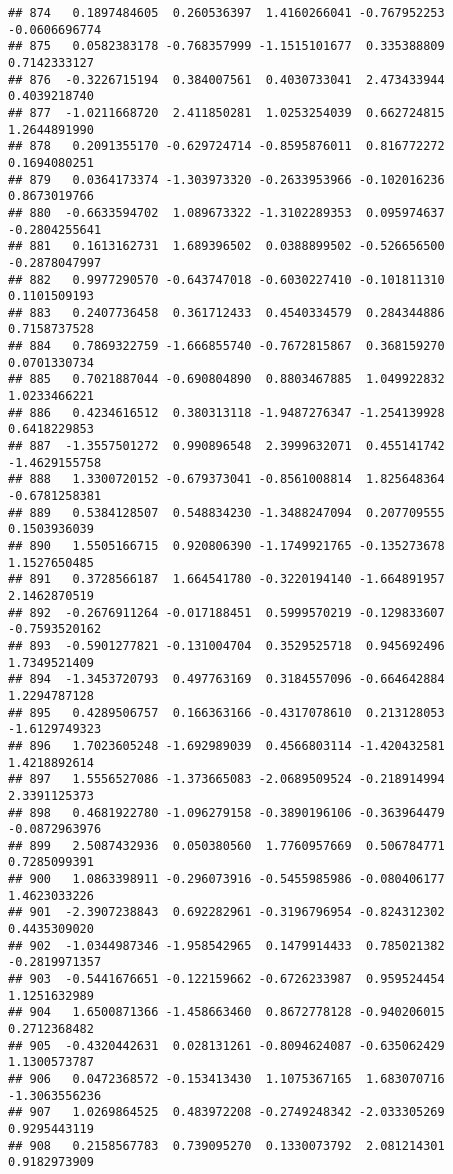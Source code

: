 \documentclass[
]{article}
\begin{document}
\begin{verbatim}
## 874   0.1897484605  0.260536397  1.4160266041 -0.767952253 -0.0606696774
## 875   0.0582383178 -0.768357999 -1.1515101677  0.335388809  0.7142333127
## 876  -0.3226715194  0.384007561  0.4030733041  2.473433944  0.4039218740
## 877  -1.0211668720  2.411850281  1.0253254039  0.662724815  1.2644891990
## 878   0.2091355170 -0.629724714 -0.8595876011  0.816772272  0.1694080251
## 879   0.0364173374 -1.303973320 -0.2633953966 -0.102016236  0.8673019766
## 880  -0.6633594702  1.089673322 -1.3102289353  0.095974637 -0.2804255641
## 881   0.1613162731  1.689396502  0.0388899502 -0.526656500 -0.2878047997
## 882   0.9977290570 -0.643747018 -0.6030227410 -0.101811310  0.1101509193
## 883   0.2407736458  0.361712433  0.4540334579  0.284344886  0.7158737528
## 884   0.7869322759 -1.666855740 -0.7672815867  0.368159270  0.0701330734
## 885   0.7021887044 -0.690804890  0.8803467885  1.049922832  1.0233466221
## 886   0.4234616512  0.380313118 -1.9487276347 -1.254139928  0.6418229853
## 887  -1.3557501272  0.990896548  2.3999632071  0.455141742 -1.4629155758
## 888   1.3300720152 -0.679373041 -0.8561008814  1.825648364 -0.6781258381
## 889   0.5384128507  0.548834230 -1.3488247094  0.207709555  0.1503936039
## 890   1.5505166715  0.920806390 -1.1749921765 -0.135273678  1.1527650485
## 891   0.3728566187  1.664541780 -0.3220194140 -1.664891957  2.1462870519
## 892  -0.2676911264 -0.017188451  0.5999570219 -0.129833607 -0.7593520162
## 893  -0.5901277821 -0.131004704  0.3529525718  0.945692496  1.7349521409
## 894  -1.3453720793  0.497763169  0.3184557096 -0.664642884  1.2294787128
## 895   0.4289506757  0.166363166 -0.4317078610  0.213128053 -1.6129749323
## 896   1.7023605248 -1.692989039  0.4566803114 -1.420432581  1.4218892614
## 897   1.5556527086 -1.373665083 -2.0689509524 -0.218914994  2.3391125373
## 898   0.4681922780 -1.096279158 -0.3890196106 -0.363964479 -0.0872963976
## 899   2.5087432936  0.050380560  1.7760957669  0.506784771  0.7285099391
## 900   1.0863398911 -0.296073916 -0.5455985986 -0.080406177  1.4623033226
## 901  -2.3907238843  0.692282961 -0.3196796954 -0.824312302  0.4435309020
## 902  -1.0344987346 -1.958542965  0.1479914433  0.785021382 -0.2819971357
## 903  -0.5441676651 -0.122159662 -0.6726233987  0.959524454  1.1251632989
## 904   1.6500871366 -1.458663460  0.8672778128 -0.940206015  0.2712368482
## 905  -0.4320442631  0.028131261 -0.8094624087 -0.635062429  1.1300573787
## 906   0.0472368572 -0.153413430  1.1075367165  1.683070716 -1.3063556236
## 907   1.0269864525  0.483972208 -0.2749248342 -2.033305269  0.9295443119
## 908   0.2158567783  0.739095270  0.1330073792  2.081214301  0.9182973909

\end{verbatim}
\end{document}
